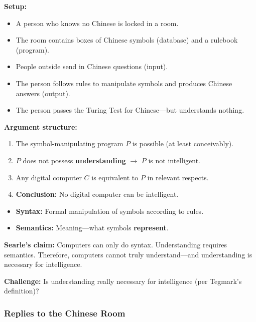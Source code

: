 \begin{thmbox}
\textbf{Setup:}
\begin{itemize}
  \item A person who knows no Chinese is locked in a room.
  \item The room contains boxes of Chinese symbols (database) and a rulebook (program).
  \item People outside send in Chinese questions (input).
  \item The person follows rules to manipulate symbols and produces Chinese answers (output).
  \item The person passes the Turing Test for Chinese---but understands nothing.
\end{itemize}

\textbf{Argument structure:}
\begin{enumerate}
  \item The symbol-manipulating program $P$ is possible (at least conceivably).
  \item $P$ does not possess \textbf{understanding} $\to$ $P$ is not intelligent.
  \item Any digital computer $C$ is equivalent to $P$ in relevant respects.
  \item \textbf{Conclusion:} No digital computer can be intelligent.
\end{enumerate}
\end{thmbox}

\begin{defbox}
\begin{itemize}
  \item \textbf{Syntax:} Formal manipulation of symbols according to rules.
  \item \textbf{Semantics:} Meaning---what symbols \textbf{represent}.
\end{itemize}

\textbf{Searle's claim:} Computers can only do syntax. Understanding requires semantics. Therefore, computers cannot truly understand---and understanding is necessary for intelligence.

\textbf{Challenge:} Is understanding really necessary for intelligence (per Tegmark's definition)?
\end{defbox}

\bigseparator

\subsubsection{Replies to the Chinese Room}

